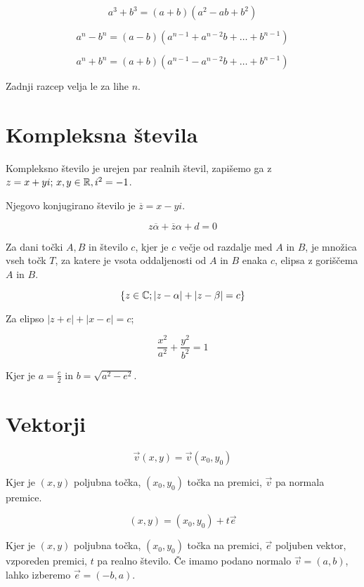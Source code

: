 \[
	a^3 + b^3 = (a+b)(a^2-ab+b^2)
\]

\[
	a^n - b^n = (a-b)(a^{n-1} + a^{n-2}b + \ldots + b^{n-1})
\]

\[
	a^n + b^n = (a+b)(a^{n-1} - a^{n-2}b + \ldots + b^{n-1})
\]

Zadnji razcep velja le za lihe $n$.

\section{Kompleksna števila}


Kompleksno število je urejen par realnih števil, zapišemo ga z $z = x+yi;\, x,y \in \mathbb{R}, i^2 = -1$.

Njegovo konjugirano število je $\overline{z} = x - yi$.


\[
	z \overline{\alpha} + \overline{z} \alpha +d = 0
\]


Za dani točki $A, B$ in število $c$, kjer je $c$ večje od razdalje med $A$ in $B$, je množica vseh točk $T$, za katere je vsota oddaljenosti od $A$ in $B$ enaka $c$, elipsa z goriščema $A$ in $B$.

\[
	\{z \in \mathbb{C}; \left|z-\alpha \right| + \left|z - \beta \right| = c\}
\]


Za elipso $\left|z+e\right| + \left|x-e\right| = c$;

\[
	\frac{x^2}{a^2} + \frac{y^2}{b^2} = 1
\]

Kjer je $a = \frac{c}{2}$ in $b = \sqrt{a^2 - e^2}$.

\section{Vektorji}


\[
	\vec{v} (x, y) = \vec{v} (x_0, y_0)
\]

Kjer je $(x, y)$ poljubna točka, $(x_0,y_0)$ točka na premici, $\vec{v}$ pa normala premice.


\[
	(x, y) = (x_0, y_0) + t\vec{e}
\]

Kjer je $(x, y)$ poljubna točka, $(x_0,y_0)$ točka na premici, $\vec{e}$ poljuben vektor, vzporeden premici, $t$ pa realno število. Če imamo podano normalo $\vec{v} = (a, b)$, lahko izberemo $\vec{e} = (-b, a)$.
